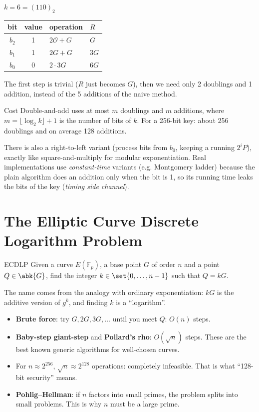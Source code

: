 \begin{framedex}{$k = 6 = (110)_2$}
  \begin{center}
    \begin{tabular}{c c l l}
      \toprule
      bit & value & operation & $R$ \\
      \midrule
      $b_2$ & 1 & $2\mathcal{O} + G$ & $G$ \\
      $b_1$ & 1 & $2G + G$ & $3G$ \\
      $b_0$ & 0 & $2 \cdot 3G$ & $6G$ \\
      \bottomrule
    \end{tabular}
  \end{center}
  The first step is trivial ($R$ just becomes $G$), then we need only 2 doublings and 1 addition, instead of the 5 additions of the naive method.
\end{framedex}

\begin{framedprop}{Cost}
  Double-and-add uses at most $m$ doublings and $m$ additions, where $m = \lfloor \log_2 k \rfloor + 1$ is the number of bits of $k$. For a 256-bit key: about 256 doublings and on average 128 additions.
\end{framedprop}

There is also a right-to-left variant (process bits from $b_0$, keeping a running $2^i P$), exactly like square-and-multiply for modular exponentiation. Real implementations use \textit{constant-time} variants (e.g. Montgomery ladder) because the plain algorithm does an addition only when the bit is 1, so its running time leaks the bits of the key (\textit{timing side channel}).

\section{The Elliptic Curve Discrete Logarithm Problem}

\begin{framedprob}[label={prob:ecdlp}]{ECDLP}
  Given a curve $E(\mathbb{F}_p)$, a base point $G$ of order $n$ and a point $Q \in \abk{G}$, find the integer $k \in \set{0, \ldots, n-1}$ such that $Q = kG$.
\end{framedprob}

The name comes from the analogy with ordinary exponentiation: $kG$ is the additive version of $g^k$, and finding $k$ is a ``logarithm''.

\begin{itemize}
  \item \textbf{Brute force}: try $G, 2G, 3G, \ldots$ until you meet $Q$: $O(n)$ steps.
  \item \textbf{Baby-step giant-step} and \textbf{Pollard's rho}: $O(\sqrt{n})$ steps. These are the best known generic algorithms for well-chosen curves.
  \item For $n \approx 2^{256}$, $\sqrt n \approx 2^{128}$ operations: completely infeasible. That is what ``128-bit security'' means.
  \item \textbf{Pohlig--Hellman}: if $n$ factors into small primes, the problem splits into small problems. This is why $n$ must be a large prime.
\end{itemize}

